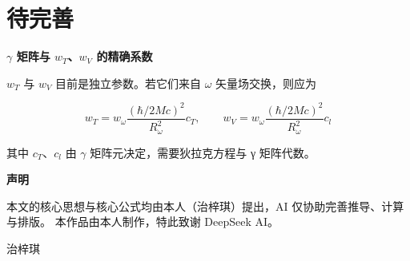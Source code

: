 \documentclass[UTF8]{ctexart}
\begin{document}
\section{待完善}

\textbf{$\gamma$ 矩阵与 $w_T$、$w_V$ 的精确系数}

$w_T$ 与 $w_V$ 目前是独立参数。若它们来自 $\omega$ 矢量场交换，则应为

\begin{equation}
w_T=w_{\omega}\frac{(\hbar/2Mc)^2}{R_{\omega}^2}c_T,\qquad
w_V=w_{\omega}\frac{(\hbar/2Mc)^2}{R_{\omega}^2}c_l
\end{equation}

其中 $c_T$、$c_l$ 由 $\gamma$ 矩阵元决定，需要狄拉克方程与 γ 矩阵代数。


\vspace{2em}
\noindent\textbf{声明}

本文的核心思想与核心公式均由本人（治梓琪）提出，AI 仅协助完善推导、计算与排版。
本作品由本人制作，特此致谢 DeepSeek AI。

\vspace{1em}
\noindent 治梓琪
\end{document}
